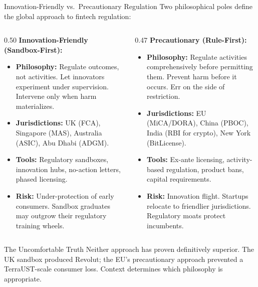 \begin{frame}{Innovation-Friendly vs.\ Precautionary Regulation}
  Two philosophical poles define the global approach to fintech regulation:

  \vspace{0.5em}
  \begin{columns}[T]
    \begin{column}{0.50\textwidth}
      \textcolor{mlpurple}{\textbf{Innovation-Friendly (Sandbox-First):}}
      \begin{itemize}
        \item \textbf{Philosophy:} Regulate outcomes, not activities. Let
              innovators experiment under supervision. Intervene only when
              harm materializes.
        \item \textbf{Jurisdictions:} UK (FCA), Singapore (MAS), Australia
              (ASIC), Abu Dhabi (ADGM).
        \item \textbf{Tools:} Regulatory sandboxes, innovation hubs, no-action
              letters, phased licensing.
        \item \textbf{Risk:} Under-protection of early consumers. Sandbox
              graduates may outgrow their regulatory training wheels.
      \end{itemize}
    \end{column}
    \begin{column}{0.47\textwidth}
      \textcolor{mlpurple}{\textbf{Precautionary (Rule-First):}}
      \begin{itemize}
        \item \textbf{Philosophy:} Regulate activities comprehensively before
              permitting them. Prevent harm before it occurs. Err on the side
              of restriction.
        \item \textbf{Jurisdictions:} EU (MiCA/DORA), China (PBOC), India
              (RBI for crypto), New York (BitLicense).
        \item \textbf{Tools:} Ex-ante licensing, activity-based regulation,
              product bans, capital requirements.
        \item \textbf{Risk:} Innovation flight. Startups relocate to
              friendlier jurisdictions. Regulatory moats protect incumbents.
      \end{itemize}
    \end{column}
  \end{columns}

  \vspace{0.3em}
  \begin{block}{The Uncomfortable Truth}
    Neither approach has proven definitively superior. The UK sandbox produced
    Revolut; the EU's precautionary approach prevented a TerraUST-scale
    consumer loss. \textcolor{mlpurple}{Context determines which philosophy
    is appropriate.}
  \end{block}
\end{frame}


